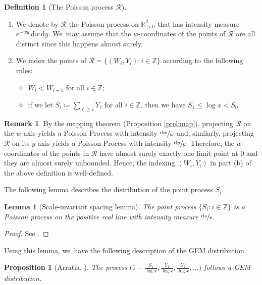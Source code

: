 \documentclass[JEP,XML,SOM,Unicode,published]{cedram}
\newenvironment{enumeratea}
{\bgroup\def\theenumi{\alph{enumi}}\begin{enumerate}}
{\end{enumerate}\egroup}
\newcommand{\ZZ}{\mathbb{Z}}
\newcommand{\RR}{\mathbb{R}}
\newcommand{\RS}{\mathscr{R}}
\newcommand{\bg}{\big}
\theoremstyle{plain}
\newtheorem{lem}[cor]{Lemma}
\newtheorem{prop}[cor]{Proposition}
\theoremstyle{definition}
\newtheorem{deff}[cor]{Definition}
\newtheorem*{rems}{Remark}
\begin{document}
\skpt
\begin{deff}[The Poisson process $\RS$]\label{dfn:Poisson Process R}
\begin{enumeratea}
\item We denote by $\RS$ the Poisson process on $\RR_{>0}^2$ that has intensity measure $e^{-wy}\, \mathrm dw\, \mathrm dy$. We~may assume that the $w$-coordinates of the points of $\RS$ are all distinct since this happens almost surely.
\item We index the points of $\RS = \bg\{(W_i, Y_i) : i \in\ZZ\bg\}$ according to the following rules:
\begin{itemize}
\item $W_i < W_{i+1}$ for all $i\in\ZZ$;
\item if we let $S_i\coloneqq \sum_{\ell \ge i} Y_\ell$ for all $i\in\ZZ$, then we have $S_1 \le \log x < S_0$.
\end{itemize}
\end{enumeratea}
\end{deff}

\begin{rems}
By the mapping theorem (Proposition \ref{prel:map}), projecting $\RS$ on the $w$-axis yields a Poisson Process with intensity $\sfrac{\mathrm dw}{w}$ and, similarly, projecting $\RS$ on its $y$\nobreakdash-axis yields a Poisson Process with intensity $\sfrac{\mathrm dy}{y}$. Therefore, the $w$-coordinates of the points in $\RS$ have almost surely exactly one limit point at $0$ and they are almost surely unbounded. Hence, the indexing $(W_i,Y_i)$ in part (b) of the above definition is well-defined.
\end{rems}

The following lemma describes the distribution of the point process $S_i$.

\begin{lem}[Scale-invariant spacing lemma]
\label{lem:scale-invariant-spacing-lemma}
The point process $\{S_i : i \in \ZZ\}$ is a Poisson process on the positive real line with intensity measure $\sfrac{\mathrm ds}{s}$.
\end{lem}

\begin{proof}
See \cite[Lem.\,7.1]{ABT06}.
\end{proof}

Using this lemma, we~have the following description of the GEM distribution.

\begin{prop}[Arratia, \cite{Arratia02}]
\label{prop:gemfrompi}
The process $\bg(1-\frac{S_1}{\log x}, \frac{Y_1}{\log x}, \frac{Y_2}{\log x}, \ldots\bg)$ follows a GEM distribution.
\end{prop}
\end{document}
